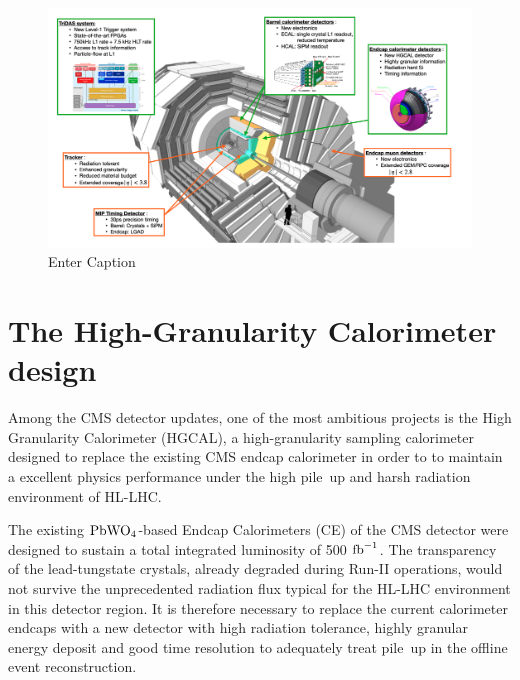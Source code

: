 \begin{figure}
    \centering
    \includegraphics[width=0.75\linewidth]{Figures//HGCAL/Screenshot 2024-03-19 at 15.32.21.png}
    \caption{Enter Caption}
    \label{fig:CMSUpgrade}
\end{figure}

\section{The High-Granularity Calorimeter design}

Among the CMS detector updates, one of the most ambitious projects is the High Granularity Calorimeter (HGCAL), a high-granularity sampling calorimeter designed to replace the existing CMS endcap calorimeter in order to to maintain a excellent physics performance under the high pile~up and harsh radiation environment of HL-LHC.

The existing $\textnormal{PbWO}_4$-based Endcap Calorimeters (CE) of the CMS detector were designed to sustain a total integrated luminosity of 500 $\textnormal{fb}^{-1}$. 
The transparency of the lead-tungstate crystals, already degraded during Run-II operations, would not survive the unprecedented radiation flux typical for the HL-LHC environment in this detector region.
It is therefore necessary to replace the current calorimeter endcaps with a new detector with high radiation tolerance, highly granular energy deposit and good time resolution to adequately treat pile~up in the offline event reconstruction. \newline

